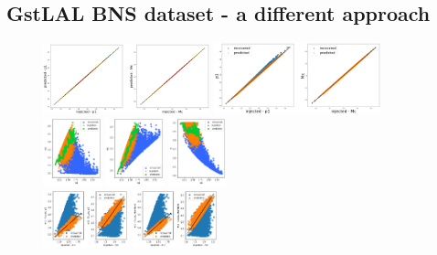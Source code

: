 \documentclass[prd,aps,twocolumn,a4paper,showkeys,nofootinbib]{revtex4-1}
\begin{document}
\subsection{GstLAL BNS dataset - a different approach}
\label{sec:GstLAL2}
%
\begin{figure}[]
  \center
  \includegraphics[width=0.43\textwidth]{./Figs/GstLAL_p_regression.png}
  \includegraphics[width=0.43\textwidth]{./Figs/GstLAL_p_regression_noise.png}\\
  \includegraphics[width=0.15\textwidth]{./Figs/GstLAL_p_m2.png}
  \includegraphics[width=0.15\textwidth]{./Figs/GstLAL_p_Mc.png}
  \includegraphics[width=0.15\textwidth]{./Figs/GstLAL_p_q.png}\\
  \includegraphics[width=0.22\textwidth]{./Figs/GstLAL_p_m1m2.png}
  \includegraphics[width=0.22\textwidth]{./Figs/GstLAL_standard_m1m2.png}

\end{figure}
\end{document}
